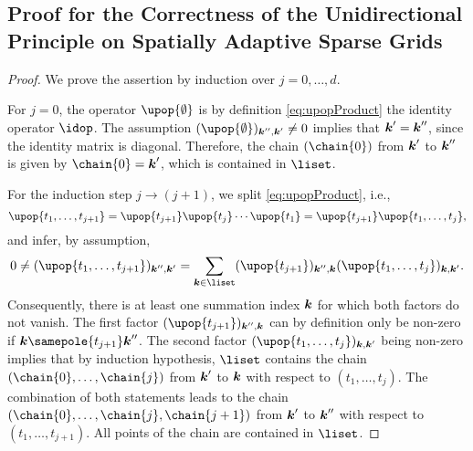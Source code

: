 \printornamentsfalse
\subsection{%
  Proof for the Correctness of the Unidirectional Principle on
  Spatially Adaptive Sparse Grids%
}
\label{sec:a134proofCorrectnessUnidirectionalPrincipleSASG}
\printornamentstrue

\lemmaChainExistenceSufficient*

\begin{proof}
  We prove the assertion by induction over $j = 0, \dotsc, d$.
  
  For $j = 0$, the operator $\upop{\emptyset}$ is by definition
  \eqref{eq:upopProduct} the identity operator $\idop$.
  The assumption $(\upop{\emptyset})_{\*k'',\*k'} \not= 0$
  implies that ${\boldsymbol{k}}' = {\boldsymbol{k}}''$, since the identity matrix is diagonal.
  Therefore, the chain $(\chain{0})$ from ${\boldsymbol{k}}'$ to ${\boldsymbol{k}}''$ is given by
  $\chain{0} = \*k'$, which is contained in $\liset$.
  
  For the induction step $j \to (j+1)$, we split \cref{eq:upopProduct},
  i.e.,
  \begin{equation}
    \upop{t_1,\dotsc,t_{j+1}}
    = \upop{t_{j+1}} \upop{t_j} \dotsm \upop{t_1}
    = \upop{t_{j+1}} \upop{t_1,\dotsc,t_j},
  \end{equation}
  and infer, by assumption,
  \begin{equation}
    \label{eq:proofLemmaChainExistenceSufficient1}
    0
    \not= (\upop{t_1,\dotsc,t_{j+1}})_{\*k'',\*k'}
    = \sum_{\*k \in \liset} (\upop{t_{j+1}})_{\*k'',\*k}
    (\upop{t_1,\dotsc,t_j})_{\*k,\*k'}.
  \end{equation}
  Consequently,
  there is at least one summation index ${\boldsymbol{k}}$
  for which both factors do not vanish.
  The first factor $(\upop{t_{j+1}})_{\*k'',\*k}$ can by definition
  only be non-zero if $\*k \samepole{t_{j+1}} \*k''$.
  The second factor $(\upop{t_1,\dotsc,t_j})_{\*k,\*k'}$ being
  non-zero implies that by induction hypothesis,
  $\liset$ contains the chain $(\chain{0}, \dotsc, \chain{j})$
  from ${\boldsymbol{k}}'$ to ${\boldsymbol{k}}$ with respect to $(t_1, \dotsc, t_j)$.
  The combination of both statements leads to
  the chain $(\chain{0}, \dotsc, \chain{j}, \chain{j+1})$ from ${\boldsymbol{k}}'$
  to ${\boldsymbol{k}}''$ with respect to $(t_1, \dotsc, t_{j+1})$.
  All points of the chain are contained in $\liset$.
\end{proof}

\lemmaChainExistenceNecessary*

